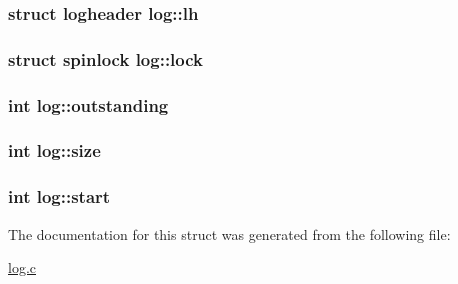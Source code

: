 \subsubsection[{\texorpdfstring{lh}{lh}}]{\setlength{\rightskip}{0pt plus 5cm}struct {\bf logheader} log\+::lh}\hypertarget{structlog_a7808516ed2f708dcb13912b1e8fc20d9}{}\label{structlog_a7808516ed2f708dcb13912b1e8fc20d9}
\subsubsection[{\texorpdfstring{lock}{lock}}]{\setlength{\rightskip}{0pt plus 5cm}struct {\bf spinlock} log\+::lock}\hypertarget{structlog_a980a1d1aa9c60af7a82f297f8ab54d2e}{}\label{structlog_a980a1d1aa9c60af7a82f297f8ab54d2e}
\subsubsection[{\texorpdfstring{outstanding}{outstanding}}]{\setlength{\rightskip}{0pt plus 5cm}int log\+::outstanding}\hypertarget{structlog_addfc1fc09a124978bd7e2a23a19d733d}{}\label{structlog_addfc1fc09a124978bd7e2a23a19d733d}
\subsubsection[{\texorpdfstring{size}{size}}]{\setlength{\rightskip}{0pt plus 5cm}int log\+::size}\hypertarget{structlog_a2257e716d4b77efd0524286cf5772a41}{}\label{structlog_a2257e716d4b77efd0524286cf5772a41}
\subsubsection[{\texorpdfstring{start}{start}}]{\setlength{\rightskip}{0pt plus 5cm}int log\+::start}\hypertarget{structlog_a28d847dd722497fa3497b14f68267618}{}\label{structlog_a28d847dd722497fa3497b14f68267618}


The documentation for this struct was generated from the following file\+:\begin{DoxyCompactItemize}
\item 
\hyperlink{log_8c}{log.\+c}\end{DoxyCompactItemize}
